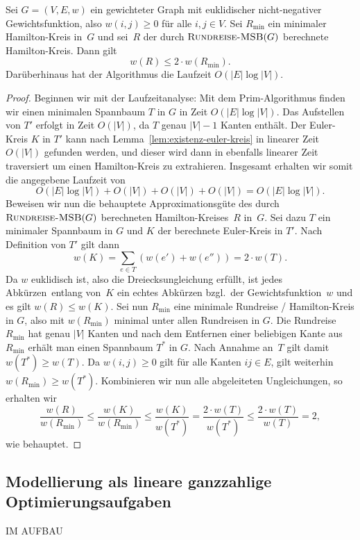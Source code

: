\begin{thm}
Sei $G=(V,E,w)$ ein gewichteter Graph mit euklidischer nicht-negativer Gewichtsfunktion, also $w(i,j) \geq 0$ für alle $i,j \in V$.
Sei $R_{\min}$ ein minimaler Hamilton-Kreis in~$G$ und sei~$R$ der durch $\mathop{\text{\textsc{Rundreise-MSB}}}(G)$ berechnete Hamilton-Kreis.
Dann gilt
\[
w(R) \leq 2 \cdot w(R_{\min}).
\]
Darüberhinaus hat der Algorithmus die Laufzeit $O(|E| \log |V|)$.
\end{thm}
\begin{proof}
Beginnen wir mit der Laufzeitanalyse: Mit dem Prim-Algorithmus finden wir einen minimalen Spannbaum $T$ in $G$ in Zeit $O(|E| \log |V|)$. Das Aufstellen von $T'$ erfolgt in Zeit $O(|V|)$, da $T$ genau $|V|-1$ Kanten enthält. Der Euler-Kreis $K$ in $T'$ kann nach Lemma~\ref{lem:existenz-euler-kreis} in linearer Zeit $O(|V|)$ gefunden werden, und dieser wird dann in ebenfalls linearer Zeit traversiert um einen Hamilton-Kreis zu extrahieren.
Insgesamt erhalten wir somit die angegebene Laufzeit von
\[
O(|E| \log |V|) + O(|V|) + O(|V|) + O(|V|) = O(|E| \log |V|).
\]
Beweisen wir nun die behauptete Approximationsgüte des durch $\mathop{\text{\textsc{Rundreise-MSB}}}(G)$ berechneten Hamilton-Kreises~$R$ in~$G$.
Sei dazu $T$ ein minimaler Spannbaum in $G$ und $K$ der berechnete Euler-Kreis in $T'$.
Nach Definition von $T'$ gilt dann
\[
w(K) = \sum_{e \in T} \left( w(e') + w(e'') \right) = 2 \cdot w(T).
\]
Da $w$ euklidisch ist, also die Dreiecksungleichung erfüllt, ist jedes \glqq Abkürzen\grqq\ entlang von~$K$ ein echtes Abkürzen bzgl.~der Gewichtsfunktion~$w$ und es gilt $w(R) \leq w(K)$.
\condclearpage
Sei nun $R_{\min}$ eine minimale Rundreise / Hamilton-Kreis in $G$, also mit $w(R_{\min})$ minimal unter allen Rundreisen in $G$.
Die Rundreise $R_{\min}$ hat genau $|V|$ Kanten und nach dem Entfernen einer beliebigen Kante aus $R_{\min}$ erhält man einen Spannbaum $T^\ast$ in $G$.
Nach Annahme an~$T$ gilt damit $w(T^\ast) \geq w(T)$.
Da $w(i,j) \geq 0$ gilt für alle Kanten $ij \in E$, gilt weiterhin $w(R_{\min}) \geq w(T^\ast)$.
Kombinieren wir nun alle abgeleiteten Ungleichungen, so erhalten wir
\[
\frac{w(R)}{w(R_{\min})} \leq \frac{w(K)}{w(R_{\min})} \leq \frac{w(K)}{w(T^\ast)} = \frac{2 \cdot w(T)}{w(T^\ast)} \leq \frac{2 \cdot w(T)}{w(T)} = 2,
\]
wie behauptet.
\end{proof}

\condclearpage
\subsection{Modellierung als lineare ganzzahlige Optimierungsaufgaben}

IM AUFBAU